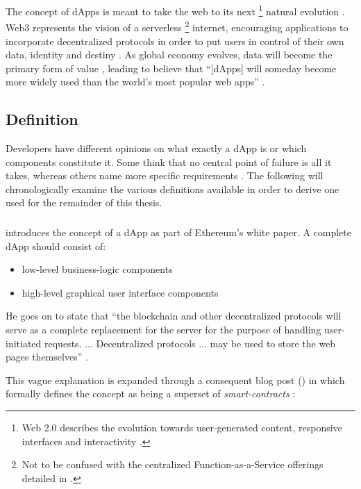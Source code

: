 The concept of \acp{dApp} is meant to take the web to its next \footnote{Web 2.0 describes the evolution towards user-generated content, responsive interfaces and interactivity \cite[p.~34]{Antonopoulos.2018}.} natural evolution \cite[pp.~34]{Antonopoulos.2018}. Web3 represents the vision of a serverless \footnote{Not to be confused with the centralized Function-as-a-Service offerings detailed in \cite{serverlessComputing}.} internet, encouraging applications to incorporate decentralized protocols in order to put users in control of their own data, identity and destiny \cite{web3}. As global economy evolves, data will become the primary form of value \cite[p.~25]{Raval.2016}, leading \citeauthor{Raval.2016} to believe that \enquote{[\acp{dApp}] will someday become more widely used than the world's most popular web apps} \cite[p.~5]{Raval.2016}.

\subsection{Definition}
Developers have different opinions on what exactly a \ac{dApp} is or which components constitute it. Some think that no central point of failure is all it takes, whereas others name more specific requirements \cite[p.~9]{Raval.2016}. The following will chronologically examine the various definitions available in order to derive one used for the remainder of this thesis. 

\subsubsection{\citeyear{EthereumWhitepaper}}
\citeauthor{EthereumWhitepaper} introduces the concept of a \ac{dApp} as part of Ethereum's white paper. A complete \ac{dApp} should consist of:

\begin{itemize}
  \item low-level business-logic components
  \item high-level graphical user interface components
\end{itemize}

He goes on to state that \enquote{the blockchain and other decentralized protocols will serve as a complete replacement for the server for the purpose of handling user-initiated requests. ... Decentralized protocols ... may be used to store the web pages themselves} \cite[p.~34]{EthereumWhitepaper}. 

This vague explanation is expanded through a consequent blog post (\citeyear{Buterin2014}) in which \citeauthor{Buterin2014} formally defines the concept as being a superset of \textit{smart-contracts} \cite{Buterin2014}:


